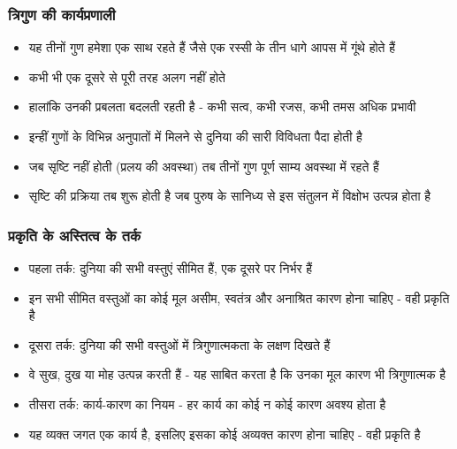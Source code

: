 \begin{frame}[fragile]\frametitle{त्रिगुण की कार्यप्रणाली}
      \begin{itemize}
	\item यह तीनों गुण हमेशा एक साथ रहते हैं जैसे एक रस्सी के तीन धागे आपस में गूंथे होते हैं
	\item कभी भी एक दूसरे से पूरी तरह अलग नहीं होते
	\item हालांकि उनकी प्रबलता बदलती रहती है - कभी सत्व, कभी रजस, कभी तमस अधिक प्रभावी
	\item इन्हीं गुणों के विभिन्न अनुपातों में मिलने से दुनिया की सारी विविधता पैदा होती है
	\item जब सृष्टि नहीं होती (प्रलय की अवस्था) तब तीनों गुण पूर्ण साम्य अवस्था में रहते हैं
	\item सृष्टि की प्रक्रिया तब शुरू होती है जब पुरुष के सानिध्य से इस संतुलन में विक्षोभ उत्पन्न होता है
	  \end{itemize}
\end{frame}

\begin{frame}[fragile]\frametitle{प्रकृति के अस्तित्व के तर्क}
      \begin{itemize}
	\item पहला तर्क: दुनिया की सभी वस्तुएं सीमित हैं, एक दूसरे पर निर्भर हैं
	\item इन सभी सीमित वस्तुओं का कोई मूल असीम, स्वतंत्र और अनाश्रित कारण होना चाहिए - वही प्रकृति है
	\item दूसरा तर्क: दुनिया की सभी वस्तुओं में त्रिगुणात्मकता के लक्षण दिखते हैं
	\item वे सुख, दुख या मोह उत्पन्न करती हैं - यह साबित करता है कि उनका मूल कारण भी त्रिगुणात्मक है
	\item तीसरा तर्क: कार्य-कारण का नियम - हर कार्य का कोई न कोई कारण अवश्य होता है
	\item यह व्यक्त जगत एक कार्य है, इसलिए इसका कोई अव्यक्त कारण होना चाहिए - वही प्रकृति है
	  \end{itemize}
\end{frame}

